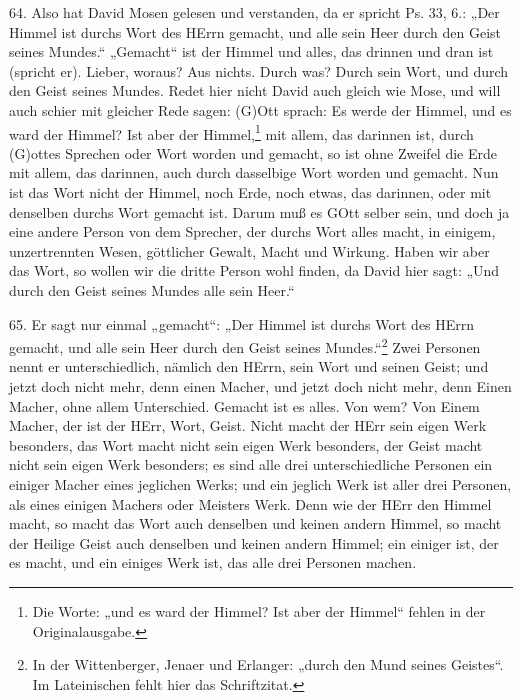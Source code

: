 64. Also hat David Mosen gelesen und verstanden, da er spricht Ps. 33, 6.: „Der Himmel ist durchs Wort des HErrn gemacht, und alle sein Heer durch den Geist seines Mundes.“ „Gemacht“ ist der Himmel und alles, das drinnen und dran ist (spricht er). Lieber, woraus? Aus nichts. Durch was? Durch sein Wort, und durch den Geist seines Mundes. Redet hier nicht David auch gleich wie Mose, und will auch schier mit gleicher Rede sagen: (G)Ott sprach: Es werde der Himmel, und es ward der Himmel? Ist aber der Himmel,\footnote{Die Worte: „und es ward der Himmel? Ist aber der Himmel“ fehlen in der Originalausgabe.} mit allem, das darinnen ist, durch (G)ottes Sprechen oder Wort worden und gemacht, so ist ohne Zweifel die Erde mit allem, das darinnen, auch durch dasselbige Wort worden und gemacht. Nun ist das Wort nicht der Himmel, noch Erde, noch etwas, das darinnen, oder mit denselben durchs Wort gemacht ist. Darum muß es GOtt selber sein, und doch ja eine andere Person von dem Sprecher, der durchs Wort alles macht, in einigem, unzertrennten Wesen, göttlicher Gewalt, Macht und Wirkung. Haben wir aber das Wort, so wollen wir die dritte Person wohl finden, da David hier sagt: „Und durch den Geist seines Mundes alle sein Heer.“

65. Er sagt nur einmal „gemacht“: „Der Himmel ist durchs Wort des HErrn gemacht, und alle sein Heer durch den Geist seines Mundes.“\footnote{In der Wittenberger, Jenaer und Erlanger: „durch den Mund seines Geistes“. Im Lateinischen fehlt hier das Schriftzitat.} Zwei Personen nennt er unterschiedlich, nämlich den HErrn, sein Wort und seinen Geist; und jetzt doch nicht mehr, denn einen Macher, und jetzt doch nicht mehr, denn Einen Macher, ohne allem Unterschied. Gemacht ist es alles. Von wem? Von Einem Macher, der ist der HErr, Wort, Geist. Nicht macht der HErr sein eigen Werk besonders, das Wort macht nicht sein eigen Werk besonders, der Geist macht nicht sein eigen Werk besonders; es sind alle drei unterschiedliche Personen ein einiger Macher eines jeglichen Werks; und ein jeglich Werk ist aller drei Personen, als eines einigen Machers oder Meisters Werk. Denn wie der HErr den Himmel macht, so macht das Wort auch denselben und keinen andern Himmel, so macht der Heilige Geist auch denselben und keinen andern Himmel; ein einiger ist, der es macht, und ein einiges Werk ist, das alle drei Personen machen.


